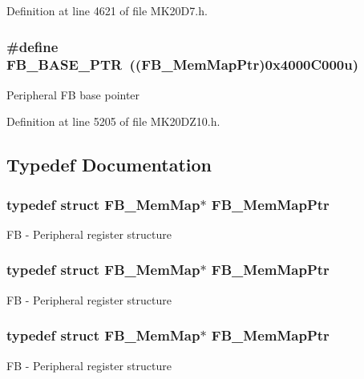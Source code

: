 Definition at line 4621 of file M\+K20\+D7.\+h.

\subsubsection[{\texorpdfstring{F\+B\+\_\+\+B\+A\+S\+E\+\_\+\+P\+TR}{FB_BASE_PTR}}]{\setlength{\rightskip}{0pt plus 5cm}\#define F\+B\+\_\+\+B\+A\+S\+E\+\_\+\+P\+TR~(({\bf F\+B\+\_\+\+Mem\+Map\+Ptr})0x4000\+C000u)}\hypertarget{group___f_b___peripheral_gace69013248279ed94480b3d6f6aa9fa6}{}\label{group___f_b___peripheral_gace69013248279ed94480b3d6f6aa9fa6}
Peripheral FB base pointer 

Definition at line 5205 of file M\+K20\+D\+Z10.\+h.



\subsection{Typedef Documentation}
\subsubsection[{\texorpdfstring{F\+B\+\_\+\+Mem\+Map\+Ptr}{FB_MemMapPtr}}]{\setlength{\rightskip}{0pt plus 5cm}typedef struct {\bf F\+B\+\_\+\+Mem\+Map}$\ast$ {\bf F\+B\+\_\+\+Mem\+Map\+Ptr}}\hypertarget{group___f_b___peripheral_gaebb09d71e958c6590cf946799cb4aa11}{}\label{group___f_b___peripheral_gaebb09d71e958c6590cf946799cb4aa11}
FB -\/ Peripheral register structure 
\subsubsection[{\texorpdfstring{F\+B\+\_\+\+Mem\+Map\+Ptr}{FB_MemMapPtr}}]{\setlength{\rightskip}{0pt plus 5cm}typedef struct {\bf F\+B\+\_\+\+Mem\+Map}$\ast$ {\bf F\+B\+\_\+\+Mem\+Map\+Ptr}}\hypertarget{group___f_b___peripheral_gaebb09d71e958c6590cf946799cb4aa11}{}\label{group___f_b___peripheral_gaebb09d71e958c6590cf946799cb4aa11}
FB -\/ Peripheral register structure 
\subsubsection[{\texorpdfstring{F\+B\+\_\+\+Mem\+Map\+Ptr}{FB_MemMapPtr}}]{\setlength{\rightskip}{0pt plus 5cm}typedef struct {\bf F\+B\+\_\+\+Mem\+Map}$\ast$ {\bf F\+B\+\_\+\+Mem\+Map\+Ptr}}\hypertarget{group___f_b___peripheral_gaebb09d71e958c6590cf946799cb4aa11}{}\label{group___f_b___peripheral_gaebb09d71e958c6590cf946799cb4aa11}
FB -\/ Peripheral register structure 